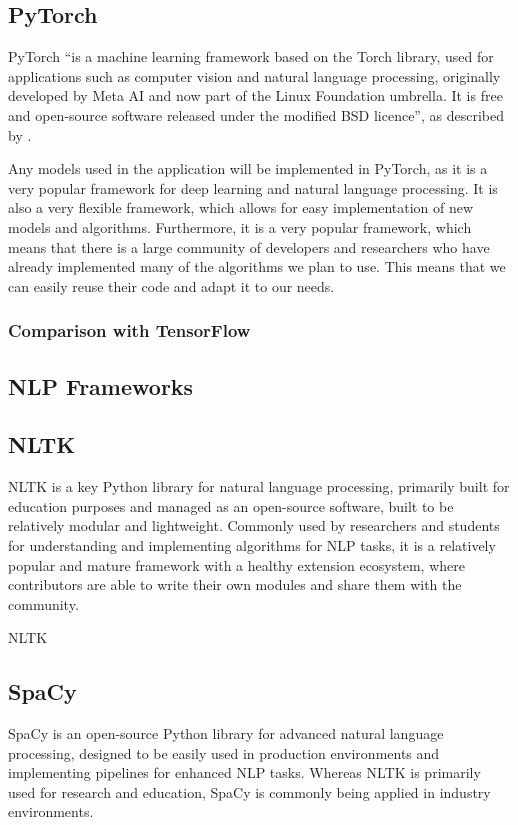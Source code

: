 \subsection{PyTorch}
PyTorch ``is a machine learning framework based on the Torch library, used for applications such as computer vision and natural language processing, originally developed by Meta AI and now part of the Linux Foundation umbrella. It is free and open-source software released under the modified BSD licence'', as described by \cite{enwiki:1146375871}.

Any models used in the application will be implemented in PyTorch, as it is a very popular framework for deep learning and natural language processing. It is also a very flexible framework, which allows for easy implementation of new models and algorithms. Furthermore, it is a very popular framework, which means that there is a large community of developers and researchers who have already implemented many of the algorithms we plan to use. This means that we can easily reuse their code and adapt it to our needs.
\subsubsection*{\textbf{Comparison with TensorFlow}}
\subsection{NLP Frameworks}
\subsection*{NLTK}
NLTK is a key Python library for natural language processing, primarily built for education purposes and managed as an open-source software, built to be relatively modular and lightweight. Commonly used by researchers and students for understanding and implementing algorithms for NLP tasks, it is a relatively popular and mature framework with a healthy extension ecosystem, where contributors are able to write their own modules and share them with the community.  

NLTK 
\subsection*{SpaCy}
SpaCy is an open-source Python library for advanced natural language processing, designed to be easily used in production environments and implementing pipelines for enhanced NLP tasks. Whereas NLTK is primarily used for research and education, SpaCy is commonly being applied in industry environments. 


